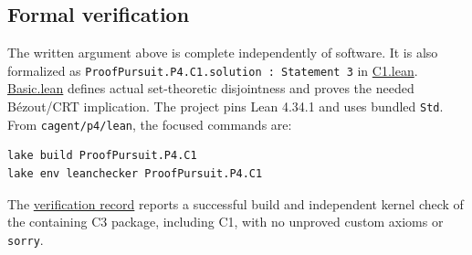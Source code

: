 \documentclass[11pt,a4paper]{article}
\begin{document}
\subsection{Formal verification}\label{formal-verification}

The written argument above is complete independently of software. It is also formalized as \texttt{ProofPursuit.P4.C1.solution\ :\ Statement\ 3} in \href{https://github.com/mpelteshki/climbing-to-the-frontier/blob/212bba53b1818c08c40b8c4b48f636651eaf6410/cagent/p4/lean/ProofPursuit/P4/C1.lean}{C1.lean}. \href{https://github.com/mpelteshki/climbing-to-the-frontier/blob/212bba53b1818c08c40b8c4b48f636651eaf6410/cagent/p4/lean/ProofPursuit/P4/Basic.lean}{Basic.lean} defines actual set-theoretic disjointness and proves the needed B\'{e}zout/CRT implication. The project pins Lean 4.34.1 and uses bundled \texttt{Std}. From \texttt{cagent/p4/lean}, the focused commands are:

\begin{Verbatim}[breaklines,breakanywhere,fontsize=\footnotesize]
lake build ProofPursuit.P4.C1
lake env leanchecker ProofPursuit.P4.C1
\end{Verbatim}

The \href{https://github.com/mpelteshki/climbing-to-the-frontier/blob/212bba53b1818c08c40b8c4b48f636651eaf6410/cagent/p4/verification.md}{verification record} reports a successful build and independent kernel check of the containing C3 package, including C1, with no unproved custom axioms or \texttt{sorry}.
\end{document}
